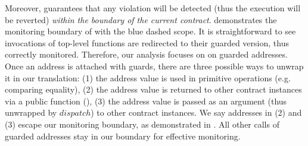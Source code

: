 Moreover, \corelang guarantees that any violation will be detected 
(thus the execution will be reverted) \emph{within the 
boundary of the current contract}. 
 demonstrates the monitoring boundary of \corelang with the blue dashed scope.
It is straightforward to see invocations of top-level functions are redirected to
their guarded version, thus correctly monitored.
Therefore, our analysis focuses on on guarded addresses. %
Once an address is attached with guards, there are three possible ways to unwrap it in
our translation: 
(1) the address value is used in primitive operations (e.g. comparing equality),
(2) the address value is returned to other contract instances via a public function 
(),
(3) the address value is passed as an argument (thus unwrapped by $\mathit{dispatch}$)
to other contract instances.
We say addresses in (2) and (3) escape our monitoring boundary, as demonstrated in .
All other calls of guarded addresses stay in our boundary for effective monitoring. 



\renewcommand{\arraystretch}{0.8}

